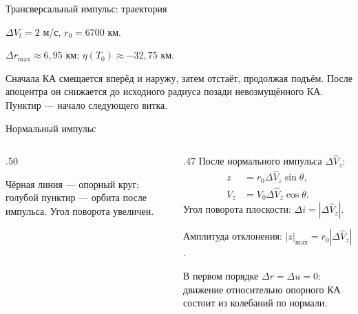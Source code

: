 \documentclass[11pt,aspectratio=169,t]{beamer}
\newcommand{\eqcompact}{\fontsize{10}{12}\selectfont}
\newcommand{\figcaption}[1]{{\usebeamerfont{caption}\color{coursemuted}#1\par}}
\begin{document}
\begin{frame}{Трансверсальный импульс: траектория}
\relax
\centering\par
\raggedright
$\Delta V_t=2$ м/с, $r_0=6700$ км.
\smallskip

$\Delta r_{\max}\approx6{,}95$ км;
$\eta(T_0)\approx-32{,}75$ км.
\smallskip

{\justifying
Сначала КА смещается вперёд и наружу, затем отстаёт, продолжая подъём. После апоцентра он снижается до исходного радиуса позади невозмущённого КА. Пунктир --- начало следующего витка.\par}
\end{frame}

\begin{frame}{Нормальный импульс}
\relax
\begin{columns}[T,onlytextwidth]
\begin{column}{.50\textwidth}
\centering
\figcaption{Чёрная линия --- опорный круг; голубой пунктир --- орбита после импульса. Угол поворота увеличен.}
\end{column}
\begin{column}{.47\textwidth}
После нормального импульса $\Delta\widehat V_z$:
{\eqcompact
\setlength{\abovedisplayskip}{3pt}\setlength{\belowdisplayskip}{3pt}
\[
 \begin{aligned}
 z&=r_0{\Delta\widehat V_z}\sin\theta,\\
 V_z&=V_0{\Delta\widehat V_z}\cos\theta.
 \end{aligned}
\]
}
Угол поворота плоскости: $\Delta i=|\Delta\widehat V_z|$.
\smallskip

Амплитуда отклонения: $|z|_{\max}=r_0|{\Delta\widehat V_z}|$.
\smallskip

{\justifying
В первом порядке $\Delta r=\Delta u=0$: движение относительно опорного КА состоит из колебаний по нормали.\par}

\end{column}
\end{columns}
\end{frame}
\end{document}
